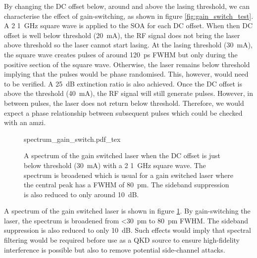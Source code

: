 
By changing the DC offset below, around and above the lasing threshold, we can characterise the effect of gain-switching, as shown in figure \ref{fig:gain_switch_test}. A \SI{2}{\Vpp} \SI{1}{GHz} square wave is applied to the SOA for each DC offset. When then DC offset is well below threshold (\SI{20}{\mA}), the RF signal does not bring the laser above threshold so the laser cannot start lasing. At the lasing threshold (\SI{30}{\mA}), the square wave creates pulses of around \SI{120}{ps} \ac{FWHM} but only during the positive section of the square wave. Otherwise, the laser remains below threshold implying that the pulses would be phase randomised. This, however, would need to be verified. A \SI{25}{dB} extinction ratio is also achieved. Once the DC offset is above the threshold (\SI{40}{\mA}), the RF signal will still generate pulses. However, in between pulses, the laser does not return below threshold. Therefore, we would expect a phase relationship between subsequent pulses which could be checked with an \ac{amzi}.

\begin{figure}[tp]
	\centering
	\small	
	\def\svgwidth{0.9\textwidth} 
	{spectrum_gain_switch.pdf_tex}
	\caption[Spectrum of the gain switched laser]{A spectrum of the gain switched laser when the DC offset is just below threshold (\SI{30}{mA}) with a \SI{2}{\Vpp} \SI{1}{\GHz} square wave. The spectrum is broadened which is usual for a gain switched laser where the central peak has a \acs{FWHM} of \SI{80}{pm}. The sideband suppression is also reduced to only around \SI{10}{dB}.}
	\label{fig:gain_switch_spectrum}
\end{figure}

A spectrum of the gain switched laser is shown in figure \ref{fig:gain_switch_spectrum}. By gain-switching the laser, the spectrum is broadened from \SI{<30}{pm} to \SI{80}{pm} \ac{FWHM}. The sideband suppression is also reduced to only \SI{10}{dB}. Such effects would imply that spectral filtering would be required before use as a \ac{QKD} source to ensure high-fidelity interference is possible but also to remove potential side-channel attacks.

